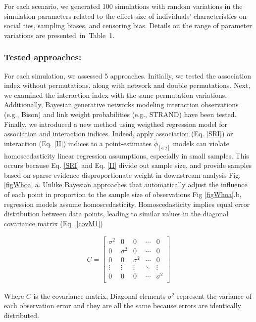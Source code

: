 \documentclass[Afour,sageh,times]{sagej}
\begin{document}
For each scenario, we generated 100 simulations with random variations in the simulation parameters related to the effect size of individuals' characteristics on social ties, sampling biases, and censoring bias. Details on the range of parameter variations are presented in Table 1.

\subsubsection{Tested approaches:}
For each simulation, we assessed 5 approaches. Initially, we tested the association index without permutations, along with network and double permutations. Next, we examined the interaction index with the same permutation variations. Additionally, Bayesian generative networks modeling interaction observations (e.g., Bison) and link weight probabilities (e.g., STRAND) have been tested. Finally, we introduced a new method using weigthed regression model for association and interaction indices. 
\newline
Indeed, apply association (Eq. \ref{SRI}) or interaction (Eq. \ref{II}) indices to a point-estimates $\dot\phi_{[i,j]}$ models can violate homoscedasticity linear regression assumptions, especially in small samples. This occurs because Eq. \ref{SRI} and Eq. \ref{II} divide out sample size, and provide samples based on sparse evidence disproportionate weight in downstream analysis Fig. \ref{figWhoa}.a. Unlike Bayesian approaches that automatically adjust the influence of each point in proportion to the sample size of observations Fig \ref{figWhoa}.b, regression models assume homoscedasticity. Homoscedasticity implies equal error distribution between data points, leading to similar values in the diagonal covariance matrix  (Eq. \ref{covM1})

\begin{ceqn}
  \begin{align}\label{covM1}
    C = 
    \begin{bmatrix}
      \sigma^2  & 0 & 0 & \cdots & 0  \\
      0 & \sigma^2 & 0 & \cdots & 0\\
      0 & 0 & \sigma^2 & \cdots & 0\\
      \vdots  &  \vdots &  \vdots & \ddots &  \vdots \\
      0 & 0 & 0 & \cdots & \sigma^2 \\
      \end{bmatrix}
  \end{align}
  \end{ceqn}
  Where $C$ is the covariance matrix, Diagonal elements $\sigma^2$ represent the variance of each observation error and they are all the same because errors are identically distributed.
\end{document}
